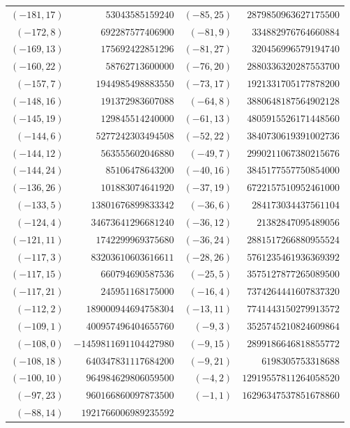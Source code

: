 \documentclass[11pt]{amsart}
\theoremstyle{definition}
\begin{document}
{\scriptsize\begin{tabular}{@{}r@{\ \ }r@{\qquad}r@{\ \ }r@{}}
$(-181,17)$ & $53043585159240$ & $(-85,25)$ & $2879850963627175500$ \\
$(-172,8)$ & $692287577406900$ & $(-81,9)$ & $334882976764660884$ \\
$(-169,13)$ & $175692422851296$ & $(-81,27)$ & $320456996579194740$ \\
$(-160,22)$ & $58762713600000$ & $(-76,20)$ & $2880336320287553700$ \\
$(-157,7)$ & $1944985498883550$ & $(-73,17)$ & $1921331705177878200$ \\
$(-148,16)$ & $191372983607088$ & $(-64,8)$ & $3880648187564902128$ \\
$(-145,19)$ & $129845514240000$ & $(-61,13)$ & $4805915526171448560$ \\
$(-144,6)$ & $5277242303494508$ & $(-52,22)$ & $3840730619391002736$ \\
$(-144,12)$ & $563555602046880$ & $(-49,7)$ & $2990211067380215676$ \\
$(-144,24)$ & $85106478643200$ & $(-40,16)$ & $3845177557750854000$ \\
$(-136,26)$ & $101883074641920$ & $(-37,19)$ & $6722157510952461000$ \\
$(-133,5)$ & $13801676899833342$ & $(-36,6)$ & $284173034437561104$ \\
$(-124,4)$ & $34673641296681240$ & $(-36,12)$ & $21382847095489056$ \\
$(-121,11)$ & $1742299969375680$ & $(-36,24)$ & $2881517266880955524$ \\
$(-117,3)$ & $83203610603616611$ & $(-28,26)$ & $5761235461936369392$ \\
$(-117,15)$ & $660794690587536$ & $(-25,5)$ & $3575127877265089500$ \\
$(-117,21)$ & $245951168175000$ & $(-16,4)$ & $7374264441607837320$ \\
$(-112,2)$ & $189000944694758304$ & $(-13,11)$ & $7741443150279913572$ \\
$(-109,1)$ & $400957496404655760$ & $(-9,3)$ & $3525745210824609864$ \\
$(-108,0)$ & $-1459811691104427980$ & $(-9,15)$ & $2899186646818855772$ \\
$(-108,18)$ & $640347831117684200$ & $(-9,21)$ & $6198305753318688$ \\
$(-100,10)$ & $964984629806059500$ & $(-4,2)$ & $12919557811264058520$ \\
$(-97,23)$ & $960166860097873500$ & $(-1,1)$ & $16296347537851678860$ \\
$(-88,14)$ & $1921766006989235592$ & & \\
\end{tabular}}\par\medskip
\end{document}
